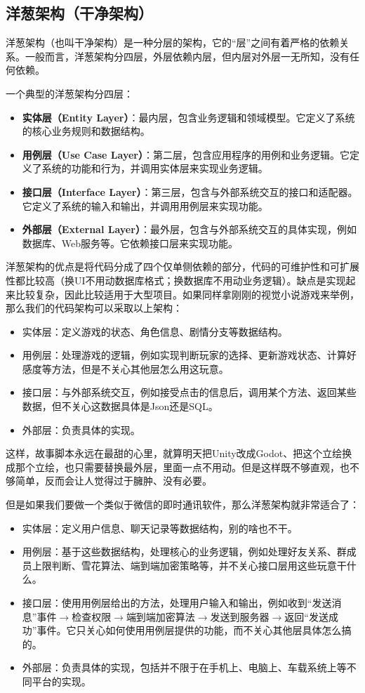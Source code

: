 \documentclass[../main.tex]{subfiles}
\begin{document}
\subsection{洋葱架构（干净架构）}

洋葱架构（也叫干净架构）是一种分层的架构，它的“层”之间有着严格的依赖关系。一般而言，洋葱架构分四层，外层依赖内层，但内层对外层一无所知，没有任何依赖。

一个典型的洋葱架构分四层：
\begin{itemize}
    \item \textbf{实体层（Entity Layer）}：最内层，包含业务逻辑和领域模型。它定义了系统的核心业务规则和数据结构。
    \item \textbf{用例层（Use Case Layer）}：第二层，包含应用程序的用例和业务逻辑。它定义了系统的功能和行为，并调用实体层来实现业务逻辑。
    \item \textbf{接口层（Interface Layer）}：第三层，包含与外部系统交互的接口和适配器。它定义了系统的输入和输出，并调用用例层来实现功能。
    \item \textbf{外部层（External Layer）}：最外层，包含与外部系统交互的具体实现，例如数据库、Web服务等。它依赖接口层来实现功能。
\end{itemize}

洋葱架构的优点是将代码分成了四个仅单侧依赖的部分，代码的可维护性和可扩展性都比较高（换UI不用动数据库格式；换数据库不用动业务逻辑）。缺点是实现起来比较复杂，因此比较适用于大型项目。如果同样拿刚刚的视觉小说游戏来举例，那么我们的代码架构可以采取以上架构：
\begin{itemize}
    \item 实体层：定义游戏的状态、角色信息、剧情分支等数据结构。
    \item 用例层：处理游戏的逻辑，例如实现判断玩家的选择、更新游戏状态、计算好感度等方法，但是不关心其他层怎么用这玩意。
    \item 接口层：与外部系统交互，例如接受点击的信息后，调用某个方法、返回某些数据，但不关心这数据具体是Json还是SQL。
    \item 外部层：负责具体的实现。
\end{itemize}
这样，故事脚本永远在最甜的心里，就算明天把Unity改成Godot、把这个立绘换成那个立绘，也只需要替换最外层，里面一点不用动。但是这样既不够直观，也不够简单，反而会让人觉得过于臃肿、没有必要。

但是如果我们要做一个类似于微信的即时通讯软件，那么洋葱架构就非常适合了：
\begin{itemize}
    \item 实体层：定义用户信息、聊天记录等数据结构，别的啥也不干。
    \item 用例层：基于这些数据结构，处理核心的业务逻辑，例如处理好友关系、群成员上限判断、雪花算法、端到端加密策略等，并不关心接口层用这些玩意干什么。
    \item 接口层：使用用例层给出的方法，处理用户输入和输出，例如收到“发送消息”事件$\rightarrow$检查权限$\rightarrow$端到端加密算法$\rightarrow$发送到服务器$\rightarrow$返回“发送成功”事件。它只关心如何使用用例层提供的功能，而不关心其他层具体怎么搞的。
    \item 外部层：负责具体的实现，包括并不限于在手机上、电脑上、车载系统上等不同平台的实现。
\end{itemize}
\end{document}
